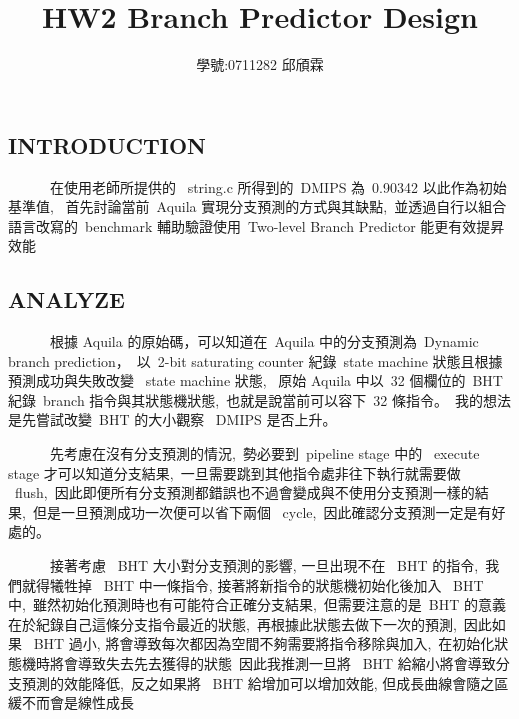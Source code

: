 \documentclass{article}
\title{\textbf{\LARGE {HW2 Branch Predictor Design}}}
\author{學號:0711282 邱頎霖}
\date{}
\begin{document}
\begin{CJK*}{UTF8}{bsmi}
\setlength{\columnsep}{1cm}

\vspace*{-50pt}
    {\let\newpage\relax\maketitle}

\begin{multicols}{2}

\begin{center}
    \section*{INTRODUCTION}
\end{center}

\begin{flushleft}
    \ \ \ \ \ \ 在使用老師所提供的 \ string.c 所得到的\ DMIPS 為\ 0.90342 以此作為初始基準值, \
    首先討論當前\ Aquila 實現分支預測的方式與其缺點,\
    並透過自行以組合語言改寫的\ benchmark 輔助驗證使用\ Two-level Branch Predictor 能更有效提昇效能
\end{flushleft}

\begin{center}
    \section*{ANALYZE}
\end{center}

\begin{flushleft}
    \ \ \ \ \ \ 根據 Aquila 的原始碼，可以知道在\ Aquila 中的分支預測為\ Dynamic branch prediction，\
    以\ 2-bit saturating counter 紀錄\ state machine 狀態且根據預測成功與失敗改變 \ state machine 狀態, \
    原始 Aquila 中以\ 32 個欄位的\ BHT 紀錄\ branch 指令與其狀態機狀態,\
    也就是說當前可以容下\ 32 條指令。\
    我的想法是先嘗試改變\ BHT 的大小觀察 \ DMIPS 是否上升。\newline
    
    \ \ \ \ \ \ 先考慮在沒有分支預測的情況,\
    勢必要到\ pipeline stage 中的 \ execute stage 才可以知道分支結果,\
    一旦需要跳到其他指令處非往下執行就需要做 \ flush,\
    因此即便所有分支預測都錯誤也不過會變成與不使用分支預測一樣的結果,\
    但是一旦預測成功一次便可以省下兩個 \ cycle,\
    因此確認分支預測一定是有好處的。\newline

    \ \ \ \ \ \ 接著考慮 \ BHT 大小對分支預測的影響, 一旦出現不在 \ BHT 的指令,\
    我們就得犧牲掉 \ BHT 中一條指令, 接著將新指令的狀態機初始化後加入 \ BHT 中,\
    雖然初始化預測時也有可能符合正確分支結果,\
    但需要注意的是\ BHT 的意義在於紀錄自己這條分支指令最近的狀態,\
    再根據此狀態去做下一次的預測,\
    因此如果 \ BHT 過小, 將會導致每次都因為空間不夠需要將指令移除與加入,\
    在初始化狀態機時將會導致失去先去獲得的狀態\
    因此我推測一旦將 \ BHT 給縮小將會導致分支預測的效能降低,\ 
    反之如果將 \ BHT 給增加可以增加效能, 但成長曲線會隨之區緩不而會是線性成長
    

\end{flushleft}
\end{multicols}
\end{CJK*}
\end{document}
